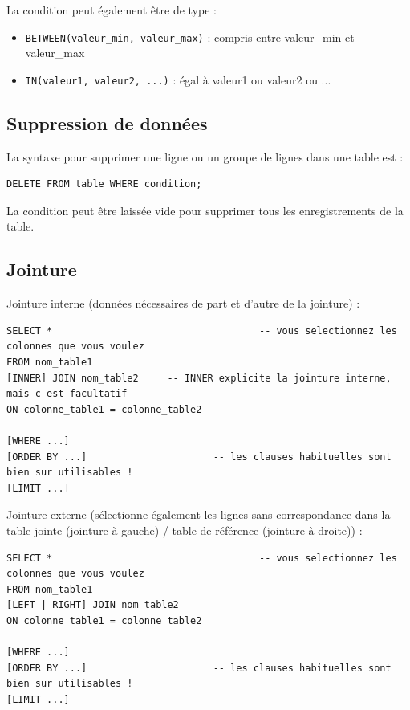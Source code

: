 \documentclass[11pt]{article}
\begin{document}
				La condition peut également être de type :
				\begin{itemize}
					\item \lstinline{BETWEEN(valeur_min, valeur_max)} : compris entre valeur\_min et valeur\_max
					\item \lstinline{IN(valeur1, valeur2, ...)} : égal à valeur1 ou valeur2 ou ...
				\end{itemize}

			
			\subsection{Suppression de données}
				La syntaxe pour supprimer une ligne ou un groupe de lignes dans une table est :
				\begin{lstlisting}
DELETE FROM table WHERE condition;				
				\end{lstlisting}
				
				La condition peut être laissée vide pour supprimer tous les enregistrements de la table.
		
		
			\subsection{Jointure}
				Jointure interne (données nécessaires de part et d'autre de la jointure) :
				\begin{lstlisting}
SELECT *									-- vous selectionnez les colonnes que vous voulez
FROM nom_table1   
[INNER] JOIN nom_table2		-- INNER explicite la jointure interne, mais c est facultatif
ON colonne_table1 = colonne_table2

[WHERE ...]                               
[ORDER BY ...]						-- les clauses habituelles sont bien sur utilisables !
[LIMIT ...]
				\end{lstlisting}
				
				
				Jointure externe (sélectionne également les lignes sans correspondance dans la table jointe (jointure à gauche) / table de référence (jointure à droite)) :
				\begin{lstlisting}
SELECT *									-- vous selectionnez les colonnes que vous voulez
FROM nom_table1   
[LEFT | RIGHT] JOIN nom_table2
ON colonne_table1 = colonne_table2

[WHERE ...]                               
[ORDER BY ...]						-- les clauses habituelles sont bien sur utilisables !
[LIMIT ...]
				\end{lstlisting}
				
		
				
\end{document}

